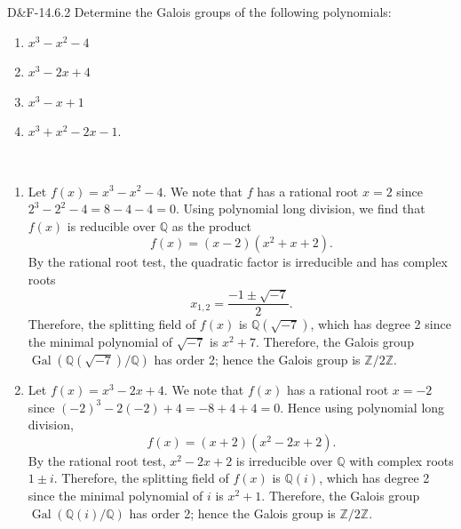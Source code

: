 \documentclass{article}
\begin{document}
\begin{prb}{D\&F-14.6.2}
	Determine the Galois groups of the following polynomials: \vspace{-0.25cm}
		\begin{enumerate}[itemsep =-2pt,label = (\roman{*})]
			\item $x^{3} - x^{2} - 4$ 
			\item $x^{3} - 2x + 4$
			\item $x^{3} - x + 1$ 
			\item $x^{3} + x^{2} - 2x - 1$.
		\end{enumerate}
\end{prb}
\begin{solutions}
	$ $\newline \vspace{-1cm}
	\begin{enumerate}[itemsep =-2pt,label = (\alph{*})]
		\item Let $f(x) = x^{3} - x^{2} - 4$. We note that $f$ has a rational root $x = 2$ since $2^{3} - 2^{2} - 4 = 8 - 4 - 4= 0$. Using polynomial long division, we find that $f(x)$ is reducible over $\mathbb{Q}$ as the product 
			\begin{equation}
				f(x) = (x - 2)(x^{2} + x + 2). 
			\end{equation}
		By the rational root test, the quadratic factor is irreducible and has complex roots 
			\begin{equation}
				x_{1,2} = \frac{-1 \pm \sqrt{-7}}{2}. 
			\end{equation}
		Therefore, the splitting field of $f(x)$ is $\mathbb{Q}(\sqrt{-7})$, which has degree 2 since the minimal polynomial of $\sqrt{-7}$ is $x^{2} + 7$. Therefore, the Galois group $\operatorname{Gal}(\mathbb{Q}(\sqrt{-7})/\mathbb{Q})$ has order 2; hence the Galois group is $\mathbb{Z}/2\mathbb{Z}$. 
		\item Let $f(x)= x^{3} - 2x + 4$. We note that $f(x)$ has a rational root $x = -2$ since $(-2)^{3} - 2(-2) + 4 = -8 + 4 + 4 = 0$. Hence using polynomial long division, 
			\begin{equation}
				f(x) = (x + 2)(x^{2} - 2x + 2). 
			\end{equation}
		By the rational root test, $x^{2} - 2x + 2$ is irreducible over $\mathbb{Q}$ with complex roots $1 \pm i$. Therefore, the splitting field of $f(x)$ is $\mathbb{Q}(i)$, which has degree 2 since the minimal polynomial of $i$ is $x^{2} + 1$. Therefore, the Galois group $\operatorname{Gal}(\mathbb{Q}(i)/\mathbb{Q})$ has order 2; hence the Galois group is $\mathbb{Z}/2\mathbb{Z}$. 

\end{enumerate}
\end{solutions}
\end{document}
